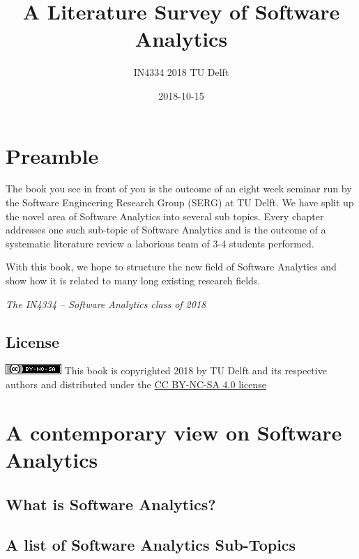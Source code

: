 \documentclass[]{book}
\title{A Literature Survey of Software Analytics}
\author{IN4334 2018 TU Delft}
\date{2018-10-15}
\begin{document}
\maketitle

{
\setcounter{tocdepth}{1}
\tableofcontents
}
\chapter{Preamble}\label{intro}

The book you see in front of you is the outcome of an eight week seminar
run by the Software Engineering Research Group (SERG) at TU Delft. We
have split up the novel area of Software Analytics into several sub
topics. Every chapter addresses one such sub-topic of Software Analytics
and is the outcome of a systematic literature review a laborious team of
3-4 students performed.

With this book, we hope to structure the new field of Software Analytics
and show how it is related to many long existing research fields.

\emph{The IN4334 -- Software Analytics class of 2018}

\section{License}\label{license}

\includegraphics{figures/cc-nc-sa.png} This book is copyrighted 2018 by
TU Delft and its respective authors and distributed under the
\href{https://creativecommons.org/licenses/by-nc-sa/4.0/}{CC BY-NC-SA
4.0 license}

\chapter{A contemporary view on Software
Analytics}\label{a-contemporary-view-on-software-analytics}

\section{What is Software Analytics?}\label{what-is-software-analytics}

\section{A list of Software Analytics
Sub-Topics}\label{a-list-of-software-analytics-sub-topics}
\end{document}
